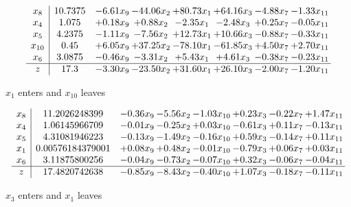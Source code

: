 \documentclass[8pt]{article}
\begin{document}
 \[\begin{array}{c| c c@{\hskip 2pt} c@{\hskip 2pt} c@{\hskip 2pt} c@{\hskip 2pt} c@{\hskip 2pt} c@{\hskip 2pt} }
 x_{8}   &  10.7375 & -6.61 x_{9} & -44.06 x_{2} & + 80.73 x_{1} & + 64.16 x_{3} & -4.88 x_{7} & -1.33 x_{11}\\
 x_{4}   &  1.075 & +  0.18 x_{9} & +  0.88 x_{2} & -2.35 x_{1} & -2.48 x_{3} & +  0.25 x_{7} & -0.05 x_{11}\\
 x_{5}   &  4.2375 & -1.11 x_{9} & -7.56 x_{2} & + 12.73 x_{1} & + 10.66 x_{3} & -0.88 x_{7} & -0.33 x_{11}\\
 x_{10}   &  0.45 & +  6.05 x_{9} & + 37.25 x_{2} & -78.10 x_{1} & -61.85 x_{3} & +  4.50 x_{7} & +  2.70 x_{11}\\
 x_{6}   &  3.0875 & -0.46 x_{9} & -3.31 x_{2} & +  5.43 x_{1} & +  4.61 x_{3} & -0.38 x_{7} & -0.23 x_{11}\\
\hline
z    &  17.3 & -3.30 x_{9} & -23.50 x_{2} & + 31.60 x_{1} & + 26.10 x_{3} & -2.00 x_{7} & -1.20 x_{11}\\
\end{array}\]


 $ x_{1} $ enters and $ x_{10} $ leaves 

 \[\begin{array}{c| c c@{\hskip 2pt} c@{\hskip 2pt} c@{\hskip 2pt} c@{\hskip 2pt} c@{\hskip 2pt} c@{\hskip 2pt} }
 x_{8}   &  11.2026248399 & -0.36 x_{9} & -5.56 x_{2} & -1.03 x_{10} & +  0.23 x_{3} & -0.22 x_{7} & +  1.47 x_{11}\\
 x_{4}   &  1.06145966709 & -0.01 x_{9} & -0.25 x_{2} & +  0.03 x_{10} & -0.61 x_{3} & +  0.11 x_{7} & -0.13 x_{11}\\
 x_{5}   &  4.31081946223 & -0.13 x_{9} & -1.49 x_{2} & -0.16 x_{10} & +  0.59 x_{3} & -0.14 x_{7} & +  0.11 x_{11}\\
 x_{1}   &  0.00576184379001 & +  0.08 x_{9} & +  0.48 x_{2} & -0.01 x_{10} & -0.79 x_{3} & +  0.06 x_{7} & +  0.03 x_{11}\\
 x_{6}   &  3.11875800256 & -0.04 x_{9} & -0.73 x_{2} & -0.07 x_{10} & +  0.32 x_{3} & -0.06 x_{7} & -0.04 x_{11}\\
\hline
z    &  17.4820742638 & -0.85 x_{9} & -8.43 x_{2} & -0.40 x_{10} & +  1.07 x_{3} & -0.18 x_{7} & -0.11 x_{11}\\
\end{array}\]


 $ x_{3} $ enters and $ x_{1} $ leaves 
\end{document}
